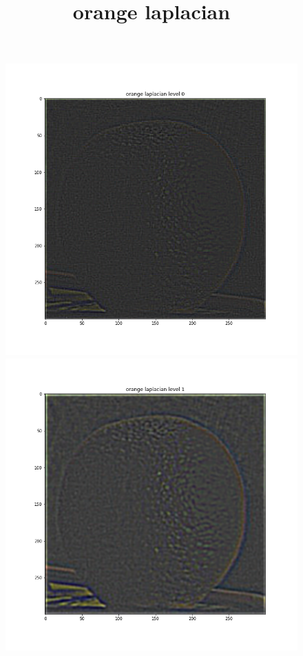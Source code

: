 \documentclass{article}
\begin{document}
\begin{figure}[!htb]
\title{orange laplacian}
    \includegraphics[width=\linewidth]{orange laplacian level 0.png}
\endminipage
{}
    \includegraphics[width=\linewidth]{orange laplacian level 1.png}

\end{figure}
\end{document}
